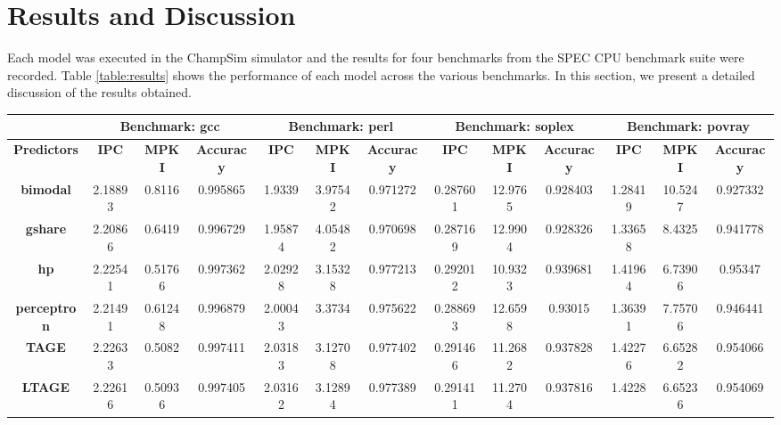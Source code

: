 \documentclass[conference]{IEEEtran}
\begin{document}
\section{Results and Discussion} \label{sec:results}
Each model was executed in the ChampSim simulator and the results for four benchmarks from the SPEC CPU benchmark suite were recorded. Table \ref{table:results} shows the performance of each model across the various benchmarks. In this section, we present a detailed discussion of the results obtained.
\begin{table*}[htbp]
    \caption{Performance Results}
    \begin{center}
    \begin{tabular}{|c|c|c|c|c|c|c|c|c|c|c|c|c|}
    \hline
    &\multicolumn{3}{|c|}{\textbf{Benchmark: gcc}}& \multicolumn{3}{|c|}{\textbf{Benchmark: perl}} & \multicolumn{3}{|c|}{\textbf{Benchmark: soplex}} & \multicolumn{3}{|c|}{\textbf{Benchmark: povray}}\\
    \hline
    \textbf{Predictors} & \textbf{IPC} & \textbf{MPKI} & \textbf{Accuracy} & \textbf{IPC}  & \textbf{MPKI} & \textbf{Accuracy} & \textbf{IPC} & \textbf{MPKI} & \textbf{Accuracy} & \textbf{IPC} & \textbf{MPKI} & \textbf{Accuracy} \\
    \hline
    \textbf{bimodal} & 2.18893 & 0.8116 & 0.995865 & 1.9339 & 3.97542 & 0.971272 & 0.287601 & 12.9765 & 0.928403 & 1.28419 & 10.5247 & 0.927332 \\
    \hline
    \textbf{gshare} & 2.20866 & 0.6419 & 0.996729 & 1.95874 & 4.05482 & 0.970698 & 0.287169 & 12.9904 & 0.928326 & 1.33658 & 8.4325 & 0.941778 \\
    \hline
    \textbf{hp} & 2.22541 & 0.51766 & 0.997362 & 2.02928 & 3.15328 & 0.977213 & 0.292012 & 10.9323 & 0.939681 & 1.41964 & 6.73906 & 0.95347 \\
    \hline
    \textbf{perceptron} & 2.21491 & 0.61248 & 0.996879 & 2.00043 & 3.3734 & 0.975622 & 0.288693 & 12.6598 & 0.93015 & 1.36391 & 7.75706 & 0.946441 \\
    \hline
    \textbf{TAGE} & 2.22633 & 0.5082 & 0.997411 & 2.03183 & 3.12708 & 0.977402 & 0.291466 & 11.2682 & 0.937828 & 1.42276 & 6.65282 & 0.954066 \\
    \hline
    \textbf{LTAGE} & 2.22616 & 0.50936 & 0.997405 & 2.03162 & 3.12894 & 0.977389 & 0.291411 & 11.2704 & 0.937816 & 1.4228 & 6.65236 & 0.954069 \\
    \hline
    \end{tabular}
    \label{table:results}
    \end{center}
\end{table*}
\end{document}

